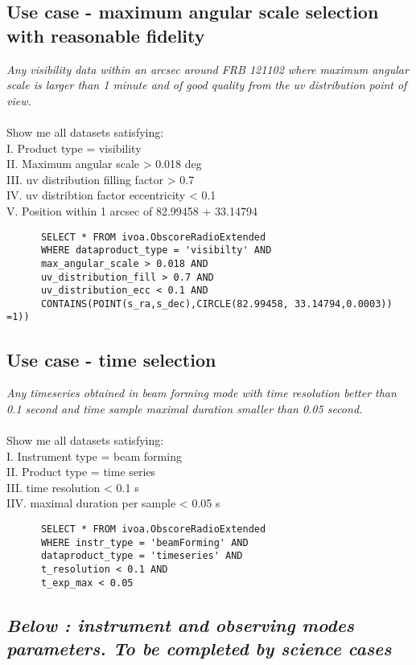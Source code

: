 \subsection{Use case - maximum angular scale selection with reasonable fidelity}
\textit{Any visibility data within an arcsec around FRB 121102 where  maximum angular scale is larger than 1 minute  and 
of good quality from the uv distribution point of view.}\\ \\
Show me all datasets satisfying:\\
I. Product type = visibility \\
II. Maximum angular scale  >  0.018 deg \\
III. uv distribution filling factor  > 0.7 \\
IV. uv distribtion factor eccentricity  < 0.1 \\
V. Position within 1 arcsec of 82.99458 + 33.14794
\begin{verbatim}
      SELECT * FROM ivoa.ObscoreRadioExtended
      WHERE dataproduct_type = 'visibilty' AND
      max_angular_scale > 0.018 AND
      uv_distribution_fill > 0.7 AND
      uv_distribution_ecc < 0.1 AND 
      CONTAINS(POINT(s_ra,s_dec),CIRCLE(82.99458, 33.14794,0.0003)) =1))
\end{verbatim}

\subsection{Use case -  time selection }
\textit{Any timeseries obtained in beam forming mode with time resolution better than 0.1 second and time sample maximal duration smaller than 0.05 second. }\\ \\
Show me all datasets satisfying:\\
I. Instrument type = beam forming\\
II. Product type = time series  \\
III. time resolution < 0.1 s\\
IIV. maximal duration per sample  < 0.05 s \\

\begin{verbatim}
      SELECT * FROM ivoa.ObscoreRadioExtended
      WHERE instr_type = 'beamForming' AND
      dataproduct_type = 'timeseries' AND
      t_resolution < 0.1 AND
      t_exp_max < 0.05 
\end{verbatim}
\subsection{\textit{Below : instrument and observing modes parameters. To be completed by science cases}}

